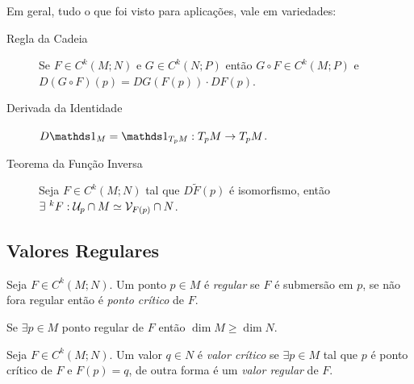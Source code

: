 \begin{note}
    Em geral, tudo o que foi visto para aplicações, vale em variedades: 
    \begin{description}
        \item[Regla da Cadeia] Se \(F\in C^k(M;N)\) e \(G \in C^k(N;P)\) então \(G \circ F \in C^k(M;P)\) e \(D(G\circ F)(p)  = DG(F(p))\cdot DF(p)\). 
        \item[Derivada da Identidade] \(D\id_{M} = \id_{T_pM}: T_pM \to T_pM\).  
        \item[Teorema da Função Inversa] Seja \(F\in C^k(M;N)\) tal que \(D\widetilde{F}(p)\) é isomorfismo, então \(\exists \ ^k F : \mathcal{U}_p\cap M \simeq \mathcal{V}_{F(p)} \cap N\).  
    \end{description}
\end{note}

\subsection{Valores Regulares}

\begin{definition}
    Seja \(F \in C^k(M;N)\). Um ponto \(p\in M\) é \emph{regular} se \(F\) é submersão em \(p\), se não fora regular então é \emph{ponto crítico} de \(F\).  
\end{definition}

\begin{note}
    Se \(\exists p\in M\) ponto regular de \(F\) então \(\dim M \geq \dim N\).
\end{note}



\begin{definition}
    Seja \(F\in C^k(M;N)\). Um valor \(q\in N\) é \emph{valor crítico} se \(\exists p\in M\) tal que \(p \) é ponto crítico de \(F\) e \(F(p)= q\), de outra forma é um \emph{valor regular} de \(F\).  
\end{definition}


